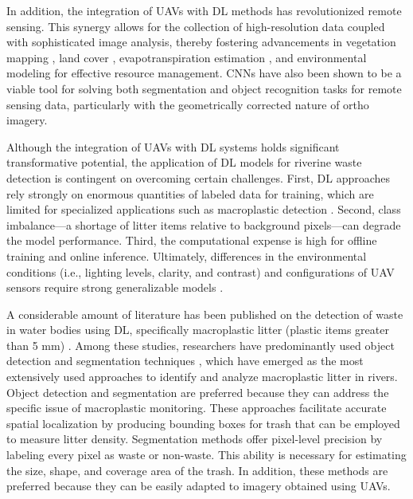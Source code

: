 \documentclass{ieeeaccess}
\begin{document}
In addition, the integration of UAVs with DL methods has revolutionized remote sensing. This synergy allows for the collection of high-resolution data coupled with sophisticated image analysis, thereby fostering advancements in vegetation mapping \cite{Kattenborn2020ConvolutionalNN}, land cover \cite{Li2018DeepLF}, evapotranspiration estimation \cite{Khanal2023IntegrationOU}, and environmental modeling \cite{Joshi2021EnsembleOD} for effective resource management. CNNs have also been shown to be a viable tool for solving both segmentation and object recognition tasks for remote sensing data, particularly with the geometrically corrected nature of ortho imagery.

Although the integration of UAVs with DL systems holds significant transformative potential, the application of DL models for riverine waste detection is contingent on overcoming certain challenges. First, DL approaches rely strongly on enormous quantities of labeled data for training, which are limited for specialized applications such as macroplastic detection \cite{Jia2023DeepLF}. Second, class imbalance—a shortage of litter items relative to background pixels—can degrade the model performance. Third, the computational expense is high for offline training and online inference. Ultimately, differences in the environmental conditions (i.e., lighting levels, clarity,    and contrast) and configurations of UAV sensors require strong generalizable models \cite{zhao2019object, sit2020comprehensive}. 

A considerable amount of literature has been published on the detection of waste in water bodies using DL, specifically macroplastic litter (plastic items greater than 5 mm) \cite{Jia2023DeepLF}. Among these studies, researchers have predominantly used object detection \cite{Maharjan2022DetectionOR, Pan2022THEAO, w16101373, 9984439, Putra2021LowRD, Zailan2022AnAS, Yang2022DetectionOR, Lin2021ImprovedYB} and segmentation techniques \cite{Tharani2021TrashDO, Jakovljevic2020ADL, Gmez2022ALA, ShijunPAN2024}, which have emerged as the most extensively used approaches to identify and analyze macroplastic litter in rivers. 
Object detection and segmentation are preferred because they can address the specific issue of macroplastic monitoring. These approaches facilitate accurate spatial localization by producing bounding boxes for trash that can be employed to measure litter density. Segmentation methods offer pixel-level precision by labeling every pixel as waste or non-waste. This ability is necessary for estimating the size, shape, and coverage area of the trash. In addition, these methods are preferred because they can be easily adapted to imagery obtained using UAVs. 
\end{document}
